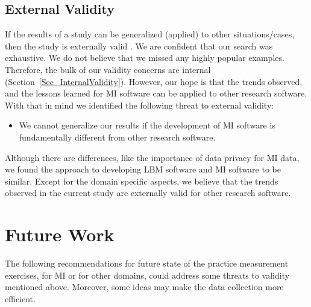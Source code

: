 \documentclass[final, 12pt, 3p, times]{elsarticle}
\begin{document}
\subsection{External Validity}

If the results of a study can be generalized (applied) to other
situations/cases, then the study is externally valid \cite{RunesonAndHost2009}.
We are confident that our search was exhaustive.  We do not believe that we
missed any highly popular examples.  Therefore, the bulk of our validity
concerns are internal (Section~\ref{Sec_InternalValidity}).
However, our hope is that the trends observed, and the lessons learned for MI
software can be applied to other research software.  With that in mind we
identified the following threat to external validity:

\begin{itemize}
\item We cannot generalize our results if the development of MI software is
fundamentally different from other research software.
\end{itemize}

Although there are differences, like the importance of data privacy for MI data,
we found the approach to developing LBM software \cite{SmithEtAl2024} and MI
software to be similar.  Except for the domain specific aspects, we believe that
the trends observed in the current study are externally valid for other research
software.

\section{Future Work} \label{Sec_FutureWork}

The following recommendations for future state of the practice measurement
exercises, for MI or for other domains, could address some threats to validity
mentioned above.  Moreover, some ideas may make the data collection more
efficient.  
\end{document}
